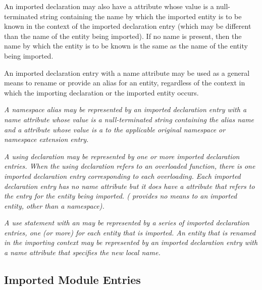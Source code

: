 An imported declaration may also have a \DWATname{}
attribute
whose value is a null-terminated string containing the
name by which the
imported entity is to be known in the context of the imported
declaration entry (which may be different than the name of
the entity being imported). If no name is present, then the
name by which the entity is to be known is the same as the
name of the entity being imported.

An imported declaration entry with a name attribute may be
used as a general means to rename or provide an alias for
an entity, regardless of the context in which the importing
declaration or the imported entity occurs.

\textit{A 
namespace alias\hypertarget{chap:DWATimportnamespacealias}{}
may be represented by an imported declaration entry
with a name attribute whose value is
a null-terminated string containing the alias name
and a \DWATimportDEFN{} attribute
whose value is a  to the
applicable original namespace or namespace extension entry.}

\textit{A  using declaration may be represented
by one or more
imported\hypertarget{chap:DWATimportnamespaceusingdeclaration}{}
declaration entries.  When the using declaration
refers to an overloaded function, there is one imported
declaration entry corresponding to each overloading. Each
imported declaration entry has no name attribute but it does
have a \DWATimportDEFN{} attribute that refers to the entry for the
entity being imported. (
provides no means to 
an imported entity, other than a namespace).}


\textit{A  use statement
with an  may be
represented by a series of imported declaration entries,
one (or more) for each entity that is imported. An entity
that is renamed in the importing context may be represented
by an imported declaration entry with a name attribute that
specifies the new local name.
}

\subsection{Imported Module Entries}
\label{chap:importedmoduleentries}

